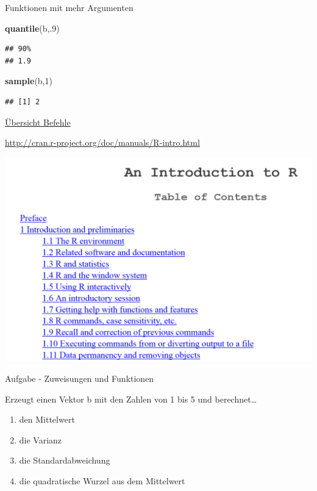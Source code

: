 \documentclass[ignorenonframetext,]{beamer}
\newenvironment{Shaded}{}{}
\newcommand{\KeywordTok}[1]{\textcolor[rgb]{0.00,0.44,0.13}{\textbf{{#1}}}}
\newcommand{\DecValTok}[1]{\textcolor[rgb]{0.25,0.63,0.44}{{#1}}}
\newcommand{\NormalTok}[1]{{#1}}
\begin{document}
\begin{frame}[fragile]{Funktionen mit mehr Argumenten}

\begin{Shaded}
\begin{Highlighting}[]
\KeywordTok{quantile}\NormalTok{(b,.}\DecValTok{9}\NormalTok{)}
\end{Highlighting}
\end{Shaded}

\begin{verbatim}
## 90% 
## 1.9
\end{verbatim}

\begin{Shaded}
\begin{Highlighting}[]
\KeywordTok{sample}\NormalTok{(b,}\DecValTok{1}\NormalTok{) }
\end{Highlighting}
\end{Shaded}

\begin{verbatim}
## [1] 2
\end{verbatim}

\end{frame}

\begin{frame}{\href{http://cran.r-project.org/doc/manuals/R-intro.html}{Übersicht
Befehle}}

\url{http://cran.r-project.org/doc/manuals/R-intro.html}

\includegraphics{./tex2pdf.956/5d240a600e94270437008ff177d88aceaa547418.png}

\end{frame}

\begin{frame}{Aufgabe - Zuweisungen und Funktionen}

Erzeugt einen Vektor b mit den Zahlen von 1 bis 5 und berechnet\ldots{}

\begin{enumerate}
\def\labelenumi{\arabic{enumi}.}
\item
  den Mittelwert
\item
  die Varianz
\item
  die Standardabweichung
\item
  die quadratische Wurzel aus dem Mittelwert
\end{enumerate}

\end{frame}
\end{document}
